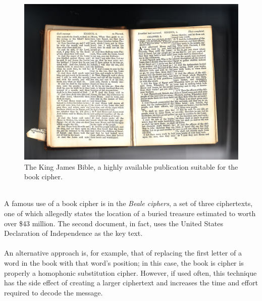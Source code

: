 \documentclass[Lau,binding=0.6cm,oneside]{sapthesis}
\begin{document}
\begin{figure}[H]
\includegraphics[scale=0.9]{king_james_bible}
\captionsetup{justification=centering, margin=2cm}
\centering
\caption{The King James Bible, a highly available publication suitable for the book cipher.}
\centering
\end{figure}
\ \\
A famous use of a book cipher is in the \textit{Beale ciphers}, a set of three ciphertexts, one of which allegedly states the location of a buried treasure estimated to worth over \$43 million. The second document, in fact, uses the United States Declaration of Independence as the key text.\\\\
An alternative approach is, for example, that of replacing the first letter of a word in the book with that word's position; in this case, the book is cipher is properly a homophonic substitution cipher. However, if used often, this technique has the side effect of creating a larger ciphertext and increases the time and effort required to decode the message.
\end{document}
